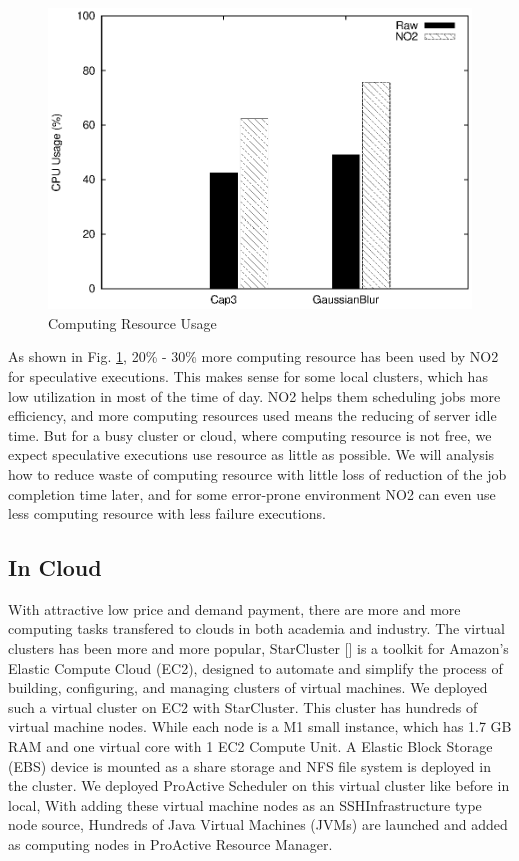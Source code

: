 \begin{figure}
\centering
\includegraphics[width=0.9\columnwidth]{figures/resource_usage.eps}
\caption{Computing Resource Usage}
\label{figure:resourceusage}
\end{figure}

As shown in Fig.  \ref{figure:resourceusage}, 20\% - 30\% more computing resource has been used by NO2 for speculative executions. This makes sense for some local clusters, which has low utilization in most of the time of day. NO2 helps them scheduling jobs more efficiency, and more computing resources used means the reducing of server idle time. But for a busy cluster or cloud, where computing resource is not free, we expect speculative executions use resource as little as possible. We will analysis how to reduce waste of computing resource with little loss of reduction of the job completion time later, and for some error-prone environment NO2 can even use less computing resource with less failure executions.

\subsection{In Cloud}

With attractive low price and demand payment, there are more and more computing tasks transfered to clouds in both academia and industry. The virtual clusters has been more and more popular, StarCluster [] is a toolkit for Amazon’s Elastic Compute Cloud (EC2), designed to automate and simplify the process of building, configuring, and managing clusters of virtual machines. We deployed such a virtual cluster on EC2 with StarCluster. This cluster has hundreds of virtual machine nodes. While each node is a M1 small instance, which has 1.7 GB RAM and one virtual core with 1 EC2 Compute Unit. A Elastic Block Storage (EBS) device is mounted as a share storage and  NFS file system is deployed in the cluster. We deployed ProActive Scheduler on this virtual cluster like before in local, With adding these virtual machine nodes as an SSHInfrastructure type node source, Hundreds of Java Virtual Machines (JVMs) are launched and added as computing nodes in ProActive Resource Manager.

